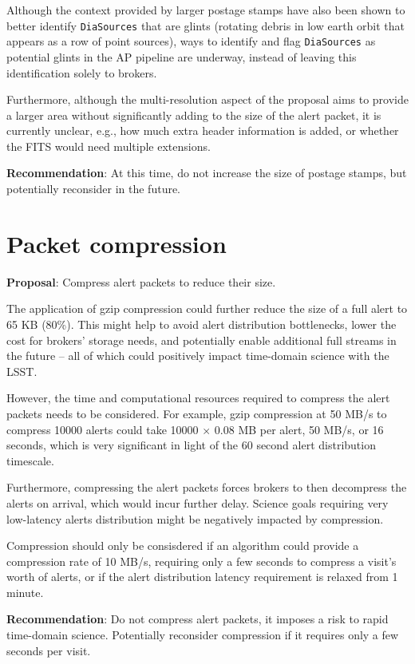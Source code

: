 \documentclass[DM,authoryear,toc]{lsstdoc}
\begin{document}
Although the context provided by larger postage stamps have also been shown to better identify \texttt{DiaSources} that are glints
(rotating debris in low earth orbit that appears as a row of point sources), ways to identify and flag \texttt{DiaSources}
as potential glints in the AP pipeline are underway, instead of leaving this identification solely to brokers.

Furthermore, although the multi-resolution aspect of the proposal aims to provide a larger area without significantly
adding to the size of the alert packet, it is currently unclear, e.g., how much extra header information is added, or whether the
FITS would need multiple extensions.

\textbf{Recommendation}: At this time, do not increase the size of postage stamps, but potentially reconsider in the future.


\section{Packet compression}\label{sec:compression}

\textbf{Proposal}: Compress alert packets to reduce their size.

The application of gzip compression could further reduce the size of a full alert to 65 KB (80\%).
This might help to avoid alert distribution bottlenecks, lower the cost for brokers' storage needs, and potentially enable 
additional full streams in the future -- all of which could positively impact time-domain science with the LSST.

However, the time and computational resources required to compress the alert packets needs to be considered.
For example, gzip compression at 50 MB/s to compress 10000 alerts could take 10000 $\times$ 0.08 MB per alert, 50 MB/s, or 
16 seconds, which is very significant in light of the 60 second alert distribution timescale. 

Furthermore, compressing the alert packets forces brokers to then decompress the alerts on arrival, which would incur further delay.
Science goals requiring very low-latency alerts distribution might be negatively impacted by compression.

Compression should only be consisdered if an algorithm could provide a compression rate of 10 MB/s, requiring only a few seconds 
to compress a visit's worth of alerts, or if the alert distribution latency requirement is relaxed from 1 minute.

\textbf{Recommendation}: Do not compress alert packets, it imposes a risk to rapid time-domain science.
Potentially reconsider compression if it requires only a few seconds per visit.
\end{document}
